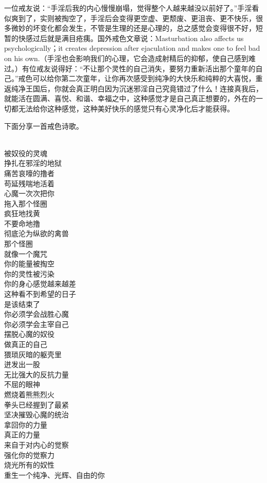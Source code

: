 一位戒友说：“手淫后我的内心慢慢崩塌，觉得整个人越来越没以前好了。”手淫看似爽到了，实则被掏空了，手淫后会变得更空虚、更颓废、更沮丧、更不快乐，很多微妙的坏变化都会发生，不管是生理的还是心理的，总之感觉会变得很不好，短暂的快感过后就是满目疮痍。国外戒色文章说：Masturbation also affects us psychologically；it creates depression after ejaculation and makes one to feel bad on his own.（手淫也会影响我们的心理，它会造成射精后的抑郁，使自己感到难过。）有位戒友说得好：“不让那个灵性的自己消失，要努力重新活出那个童年的自己。”戒色可以给你第二次童年，让你再次感受到纯净的大快乐和纯粹的大喜悦，重返纯净王国后，你就会真正明白因为沉迷邪淫自己究竟错过了什么！连接真我后，就能活在圆满、喜悦、和谐、幸福之中，这种感觉才是自己真正想要的，外在的一切都无法给你这种感觉，这种美好快乐的感觉只有心灵净化后才能获得。

下面分享一首戒色诗歌。

\begin{poem}[拿回你的力量]
    \begin{multicols}{3}
        \centering~\\
        被奴役的灵魂 \\ 挣扎在邪淫的地狱 \\ 痛苦哀嚎的撸者 \\ 苟延残喘地活着 \\ 心魔一次次把你 \\ 拖入那个怪圈 \\ 疯狂地找黄 \\ 不要命地撸 \\ 彻底沦为纵欲的禽兽 \\ 那个怪圈 \\ 就像一个魔咒 \\ 你的能量被掏空 \\ 你的灵性被污染 \\ 你的身心感觉越来越差 \\ 这种看不到希望的日子 \\ 是该结束了 \\ 你必须学会战胜心魔 \\ 你必须学会主宰自己 \\ 摆脱心魔的奴役 \\ 做真正的自己 \\ 猥琐灰暗的躯壳里 \\ 迸发出一股 \\ 无比强大的反抗力量 \\ 不屈的眼神 \\ 燃烧着熊熊烈火 \\ 拳头已经握到了最紧 \\ 坚决摧毁心魔的统治 \\ 拿回你的力量 \\ 真正的力量 \\ 来自于对内心的觉察 \\ 强化你的觉察力 \\ 烧光所有的奴性 \\ 重生一个纯净、光辉、自由的你
    \end{multicols}
\end{poem}

